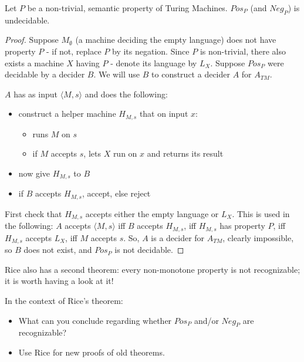 \begin{theorem}
Let $P$ be a non-trivial, semantic property of Turing
Machines. $Pos_P$ (and $Neg_P$) is undecidable.
\end{theorem}
\begin{proof}
Suppose $M_\emptyset$ (a machine deciding the empty language) does not
have property $P$ - if not, replace $P$ by its negation. Since $P$ is
non-trivial, there also exists a machine $X$ having $P$ - denote
its language by $L_X$. Suppose $Pos_P$ were decidable by a decider
$B$. We will use $B$ to construct a decider $A$ for $A_{TM}$.

$A$ has as input $\langle M,s \rangle$ and does the following:
\begin{itemize}
\item construct a helper machine $H_{M,s}$ that on input $x$:

\begin{itemize}
\item runs $M$ on $s$
\item if $M$ accepts $s$, lets $X$ run on $x$ and returns its result
\end{itemize}

\item now give $H_{M,s}$ to $B$
\item if $B$ accepts $H_{M,s}$, accept, else reject
\end{itemize}
First check that $H_{M,s}$ accepts either the empty language or
$L_X$. This is used in the following:
$A$ accepts $\langle M,s \rangle$ iff $B$ accepts $H_{M,s}$, iff
%
$H_{M,s}$ has property $P$, iff
%
$H_{M,s}$ accepts $L_X$, iff
%
$M$ accepts $s$.
So, $A$ is a decider for $A_{TM}$, clearly impossible, so $B$ does not
exist, and $Pos_P$ is not decidable.
\end{proof}

Rice also has a second theorem: every non-monotone property is not
recognizable; it is worth having a look at it!

\begin{exercise}
In the context of Rice's theorem:
\begin{itemize}
\item
What can you conclude regarding whether $Pos_P$ and/or $Neg_P$ are
recognizable?

\item Use Rice for new proofs of old theorems.
\end{itemize}
\end{exercise}


